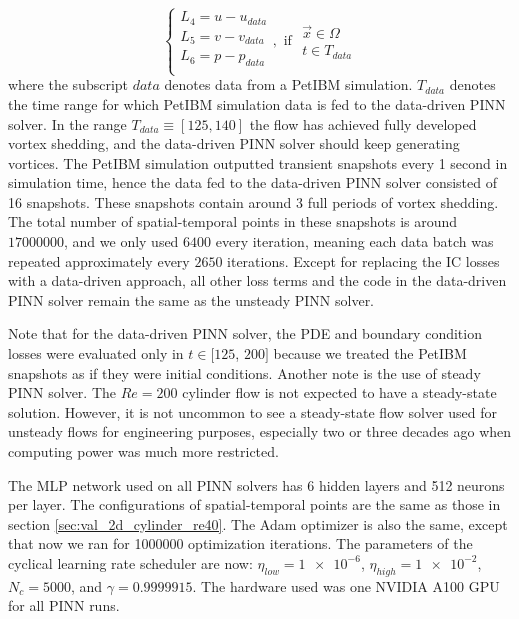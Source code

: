 \begin{equation}\label{eq:data-driven-loss}
    \left\{
        \begin{array}{l}
            L_4 = u - u_{data}\\
            L_5 = v - v_{data}\\
            L_6 = p - p_{data}\\
        \end{array}
    \right.
    ,\text{ if }
    \begin{array}{l}
        \vec{x} \in \Omega \\
        t \in T_{data}
    \end{array}
\end{equation}
where the subscript $data$ denotes data from a PetIBM simulation.
$T_{data}$ denotes the time range for which PetIBM simulation data is fed to the data-driven PINN solver.
In the range $T_{data} \equiv \left[125, 140\right]$ the flow has achieved fully developed vortex shedding, and the data-driven PINN solver should keep generating vortices.
The PetIBM simulation outputted transient snapshots every 1 second in simulation time, hence the data fed to the data-driven PINN solver consisted of 16 snapshots.
These snapshots contain around $3$ full periods of vortex shedding.
The total number of spatial-temporal points in these snapshots is around $\num{17000000}$, and we only used $\num{6400}$ every iteration, meaning each data batch was repeated approximately every $\num{2650}$ iterations.
Except for replacing the IC losses with a data-driven approach, all other loss terms and the code in the data-driven PINN solver remain the same as the unsteady PINN solver.

Note that for the data-driven PINN solver, the PDE and boundary condition losses were evaluated only in $t\in[125$, $200]$ because we treated the PetIBM snapshots as if they were initial conditions.
Another note is the use of steady PINN solver.
The $Re=200$ cylinder flow is not expected to have a steady-state solution.
However, it is not uncommon to see a steady-state flow solver used for unsteady flows for engineering purposes, especially two or three decades ago when computing power was much more restricted.

The MLP network used on all PINN solvers has 6 hidden layers and 512 neurons per layer.
The configurations of spatial-temporal points are the same as those in section \ref{sec:val_2d_cylinder_re40}.
The Adam optimizer is also the same, except that now we ran for \num{1000000} optimization iterations.
The parameters of the cyclical learning rate scheduler are now: $\eta_{low}=\num{1e-6}$, $\eta_{high}=\num{1e-2}$, $N_c=5000$, and $\gamma=\num{0.9999915}$.
The hardware used was one NVIDIA A100 GPU for all PINN runs.

